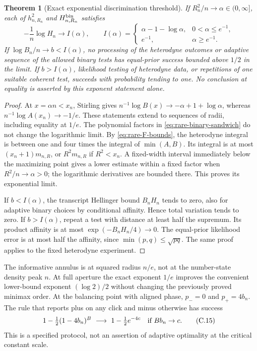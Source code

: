 \documentclass[11pt,a4paper]{article}
\newtheorem{theorem}{Theorem}[section]\newtheorem{proposition}[theorem]{Proposition}\newtheorem{corollary}[theorem]{Corollary}\newtheorem{lemma}[theorem]{Lemma}\newtheorem{remark}[theorem]{Remark}
\numberwithin{equation}{section}
\begin{document}
\begin{theorem}[Exact exponential discrimination threshold]
\label{thm:rare-exponent}
If $R_n^2/n\to\alpha\in(0,\infty]$, each of $h_{n,R_n}^2$ and
$H_{n,R_n}^{\rm bin}$ satisfies
\[
 -\frac1n\log H_n\longrightarrow I(\alpha),\qquad
 I(\alpha)=\begin{cases}
 \alpha-1-\log\alpha,&0<\alpha\le e^{-1},\\
 e^{-1},&\alpha\ge e^{-1}.
 \end{cases}
 \tag{C.14}\label{eq:rare-exponent}
\]
If $\log B_n/n\to b<I(\alpha)$, no processing of the heterodyne outcomes
or adaptive sequence of the allowed binary tests has equal-prior success
bounded above $1/2$ in the limit. If $b>I(\alpha)$, likelihood testing of
heterodyne data, or repetitions of one suitable coherent test, succeeds
with probability tending to one. No conclusion at equality is asserted by
this exponent statement alone.
\end{theorem}
\begin{proof}
At $x=\alpha n<x_n$, Stirling gives
$n^{-1}\log B(x)\to-\alpha+1+\log\alpha$, whereas
$n^{-1}\log A(x_n)\to-1/e$. These statements extend to sequences of radii,
including equality at $1/e$. The polynomial factors in
\eqref{eq:rare-binary-sandwich} do not change the logarithmic limit.
By \eqref{eq:rare-F-bounds}, the heterodyne integral is between one and four
times the integral of $\min(A,B)$. Its integral is at most
$(x_n+1)m_{n,R}$, or $R^2m_{n,R}$ if $R^2<x_n$.
A fixed-width interval immediately below the maximizing point gives a
lower estimate within a fixed factor when $R^2/n\to\alpha>0$; the
logarithmic derivatives are bounded there. This proves its exponential limit.

If $b<I(\alpha)$, the transcript Hellinger bound $B_nH_n$ tends to zero,
also for adaptive binary choices by conditional affinity. Hence total
variation tends to zero. If $b>I(\alpha)$, repeat a test with distance at
least half the supremum. Its product affinity is at most
$\exp(-B_nH_n/4)\to0$. The equal-prior likelihood error is at most half
the affinity, since $\min(p,q)\le\sqrt{pq}$. The same proof applies to the
fixed heterodyne experiment.
\end{proof}

The informative annulus is at squared radius $n/e$, not at the number-state
density peak $n$. At full aperture the exact exponent $1/e$ improves the
convenient lower-bound exponent $(\log2)/2$ without changing the previously
proved minimax order.
At the balancing point with aligned phase, $p_-=0$ and $p_+=4b_n$.
The rule that reports plus on any click and minus otherwise has success
\[
 1-\tfrac12(1-4b_n)^B\ \longrightarrow\ 1-\tfrac12e^{-4c}
 \quad\hbox{if }Bb_n\to c.
 \tag{C.15}\label{eq:rare-poisson}
\]
This is a specified protocol, not an assertion of adaptive optimality at
the critical constant scale.
\end{document}
